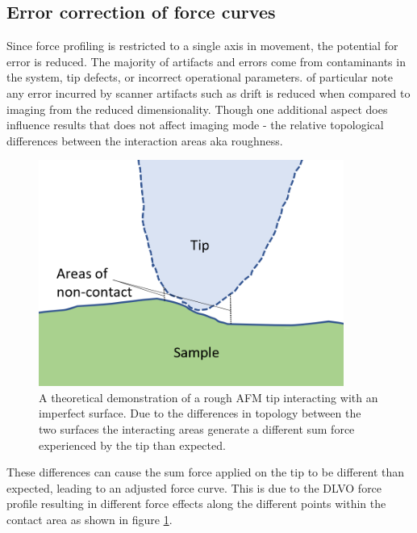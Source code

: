 \newpage

\subsection{Error correction of force curves}

Since force profiling is restricted to a single axis in movement, the potential for error is reduced. The majority of artifacts and errors come from contaminants in the system, tip defects, or incorrect operational parameters. of particular note any error incurred by scanner artifacts such as drift is reduced when compared to imaging from the reduced dimensionality. Though one additional aspect does influence results that does not affect imaging mode - the relative topological differences between the interaction areas aka roughness. \cite{TipRoughness}

\begin{figure}[h!]     %
        \begin{center}
          \includegraphics[width=100mm]{chapter2/tip contact.PNG}
\end{center}
\caption{A theoretical demonstration of a rough AFM tip interacting with an imperfect surface. Due to the differences in topology between the two surfaces the interacting areas generate a different sum force experienced by the tip than expected.}
\label{fig:tipCont}                 %
\end{figure}

These differences can cause the sum force applied on the tip to be different than expected, leading to an adjusted force curve. This is due to the DLVO force profile resulting in different force effects along the different points within the contact area as shown in figure \ref{fig:tipCont}.

